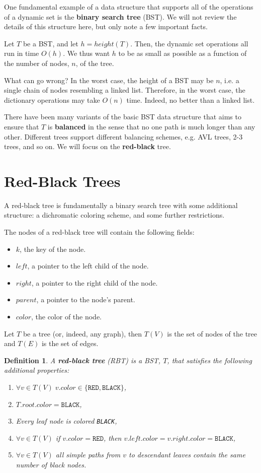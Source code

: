 \documentclass[10pt]{article}
\newtheorem{definition}{Definition}[section]
\begin{document}
One fundamental example of a data structure that supports all of the
operations of a dynamic set is the \textbf{binary search tree} (BST). We will
not review the details of this structure here, but only note a few important
facts.

Let $T$ be a BST, and let $h = height(T)$. Then, the dynamic set operations
all run in time $O(h)$. We thus want $h$ to be as small as possible as a
function of the number of nodes, $n$, of the tree.

What can go wrong? In the worst case, the height of a BST may be $n$, i.e. a
single chain of nodes resembling a linked list. Therefore, in the worst case,
the dictionary operations may take $O(n)$ time. Indeed, no better than a linked list.

There have been many variants of the basic BST data structure that aims
to ensure that $T$ is \textbf{balanced} in the sense that no one path is
much longer than any other. Different trees support different balancing schemes,
e.g. AVL trees, 2-3 trees, and so on. We will focus on the \textbf{red-black}
tree.

\section{Red-Black Trees}

A red-black tree is fundamentally a binary search tree with
some additional structure: a dichromatic coloring scheme, and some further
restrictions.

The nodes of a red-black tree will contain
the following fields:
\begin{itemize}
  \item $k$, the key of the node.
  \item $left$, a pointer to the left child of the node.
  \item $right$, a pointer to the right child of the node.
  \item $parent$, a pointer to the node's parent.
  \item $color$, the color of the node.
\end{itemize}

Let $T$ be a tree (or, indeed, any graph), then $T(V)$ is the set of nodes
of the tree and $T(E)$ is the set of edges.

\begin{definition}
  A \textbf{red-black tree} (RBT) is a BST, $T$, that satisfies the following additional
  properties:
  \begin{enumerate}[label=\Roman*.]
    \item $\forall v \in T(V) \; v.color \in \{\texttt{RED}, \texttt{BLACK}\}$,
    \item $T.root.color = \texttt{BLACK}$,
    \item Every leaf node is colored \texttt{BLACK},
    \item $\forall v \in T(V)$ if $v.color = \texttt{RED}$,
      then $v.left.color = v.right.color = \texttt{BLACK}$,
    \item $\forall v \in T(V)$ all simple paths from $v$ to descendant leaves
      contain the same number of black nodes.
  \end{enumerate}
\end{definition}
\end{document}
